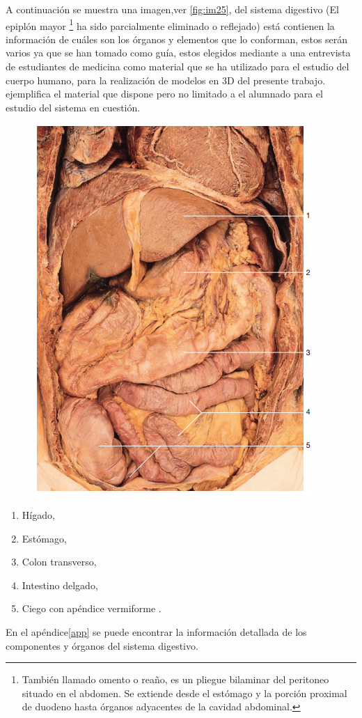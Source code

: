 A continuación se muestra una imagen,ver \ref{fig:im25}, del sistema digestivo (El epiplón mayor
\footnote{También llamado omento o reaño, es un pliegue bilaminar del peritoneo situado en el abdomen. Se extiende desde el estómago y la porción proximal de duodeno hasta órganos adyacentes de la cavidad abdominal.} 
ha sido parcialmente eliminado o reflejado)  está contienen la información de cuáles son los órganos y elementos que lo conforman, estos serán 
varios ya que se han tomado como guía, estos elegidos mediante a una entrevista de estudiantes de medicina como material que se ha utilizado para el estudio del cuerpo 
humano, para la realización de modelos en 3D del presente trabajo. ejemplifica el material que dispone pero no limitado a el alumnado para el estudio del sistema en cuestión.\\
\begin{figure}[H]
	\begin{center}
 		\includegraphics[width = .4\textwidth]{source/images/image72.png}
	\end{center} 
\end{figure}
\begin{enumerate}
	\item Hígado,
	\item Estómago,
	\item Colon transverso,
	\item Intestino delgado,
	\item Ciego con apéndice vermiforme	.
\end{enumerate}
En el apéndice\ref{app} se puede encontrar la información detallada de los componentes y órganos del sistema digestivo.

